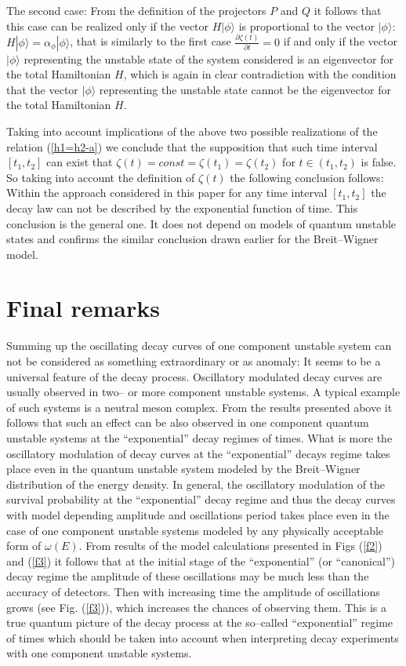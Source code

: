 \documentclass[12pt]{article}
\begin{document}
The second case: From the definition of the projectors $P$ and $Q$ it follows that this case can be realized only if the vector $H|\phi \rangle$ is proportional to the vector $|\phi\rangle$:  $H|\phi \rangle = \alpha_{\phi} |\phi\rangle$,
that is similarly to the first case $\frac{\partial \zeta (t)}{\partial t} = 0$ if and only
if the vector $|\phi\rangle$ representing the unstable state of the system considered is an eigenvector for the total Hamiltonian $H$,
which is again in clear contradiction with the condition that the vector $|\phi\rangle$ representing the  unstable state cannot be the eigenvector for the total Hamiltonian $H$.

Taking into account implications of the above two possible realizations of the relation (\ref{h1=h2-a})
we conclude that the supposition that such time interval $[t_{1},t_{2}]$ can exist that $\zeta (t) = const = \zeta(t_{1}) = \zeta(t_{2})$ for $t \in (t_{1},t_{2})$ is false. So taking into account the definition of $\zeta (t)$ the following conclusion follows:
Within the approach considered in this paper  for any time interval $[t_{1},t_{2}]$ the decay law can not be described by the exponential function of time. This conclusion is the general one. It does not depend on models of quantum unstable states and confirms the similar conclusion  drawn earlier for the Breit--Wigner model.


\section{Final remarks}
Summing up the oscillating decay curves of  one component unstable system can not be considered as something extraordinary or as anomaly: It seems to be a universal
feature of the decay process.
Oscillatory modulated decay curves are usually observed in two-- or more component unstable systems. A typical example of such systems is a neutral meson complex. From the results presented above it follows that such an effect can be also  observed in one component quantum unstable systems at the ``exponential'' decay regimes of times. What is more the oscillatory modulation of decay curves at the ``exponential'' decays regime takes place even in the quantum unstable system modeled by the Breit--Wigner distribution of the energy density.
In general,
 the oscillatory modulation of the survival probability at the ``exponential'' decay regime and thus the decay curves with model depending amplitude and oscillations period
takes place even in the case of one component unstable systems
modeled by  any physically acceptable form of $\omega (E)$.
From results of the model calculations presented in Figs (\ref{f2}) and (\ref{f3}) it follows that at the initial stage of the ``exponential'' (or ``canonical'') decay regime
the amplitude of these oscillations  may be much less than the accuracy of detectors. Then  with increasing time  the amplitude of oscillations grows (see Fig. (\ref{f3})), which increases the chances of observing them.
This is a true quantum picture of the decay process at the so--called ``exponential'' regime of times which should be taken into account when interpreting decay experiments
with one component unstable systems.
\end{document}
